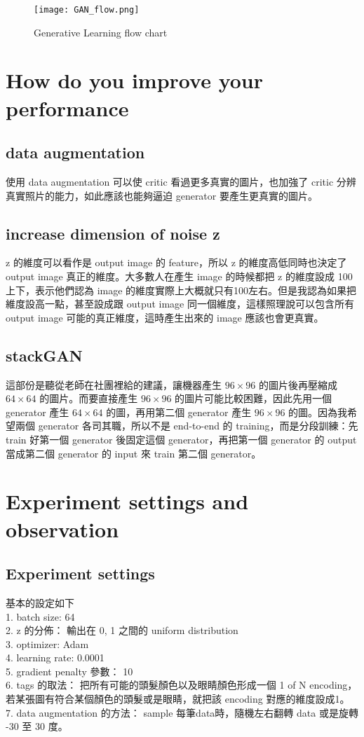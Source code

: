 \documentclass[10pt, a4paper]{article}
\begin{document}
\begin{CJK}{UTF8}{bkai}
\begin{figure}[!htb]
\centering
\texttt{[image: GAN\_flow.png]}

\caption{Generative Learning flow chart}
\label{fig:f4}
\end{figure}


\section{How do you improve your performance }

\subsection{data augmentation}
使用 data augmentation 可以使 critic 看過更多真實的圖片，也加強了 critic 分辨真實照片的能力，如此應該也能夠逼迫 generator 要產生更真實的圖片。
\subsection{increase dimension of noise z}
z 的維度可以看作是 output image 的 feature，所以 z 的維度高低同時也決定了 output image 真正的維度。大多數人在產生 image 的時候都把 z 的維度設成 100 上下，表示他們認為 image 的維度實際上大概就只有100左右。但是我認為如果把維度設高一點，甚至設成跟 output image 同一個維度，這樣照理說可以包含所有 output image 可能的真正維度，這時產生出來的 image 應該也會更真實。 
\subsection{stackGAN}
這部份是聽從老師在社團裡給的建議，讓機器產生 $96 \times 96$ 的圖片後再壓縮成 $64 \times 64$ 的圖片。而要直接產生 $96 \times 96$ 的圖片可能比較困難，因此先用一個 generator 產生 $64 \times 64$ 的圖，再用第二個 generator 產生 $96 \times 96$ 的圖。因為我希望兩個 generator 各司其職，所以不是 end-to-end 的 training，而是分段訓練：先 train 好第一個 generator 後固定這個 generator，再把第一個 generator 的 output 當成第二個 generator 的 input 來 train 第二個 generator。

\section{Experiment settings and observation}
\subsection{Experiment settings}
基本的設定如下 \\
1. batch size: 64 \\
2. z 的分佈： 輸出在 0, 1 之間的 uniform distribution \\
3. optimizer: Adam \\
4. learning rate: 0.0001 \\
5. gradient penalty 參數： 10 \\
6. tags 的取法： 把所有可能的頭髮顏色以及眼睛顏色形成一個 1 of N encoding，若某張圖有符合某個顏色的頭髮或是眼睛，就把該 encoding 對應的維度設成1。\\
7. data augmentation 的方法： sample 每筆data時，隨機左右翻轉 data 或是旋轉 -30 至 30 度。



\end{CJK}
\end{document}
